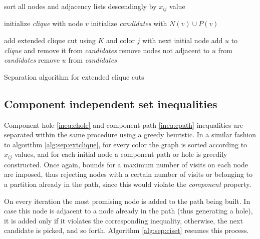 \begin{algorithm}
\begin{algorithmic}

\STATE sort all nodes and adjacency lists descendingly by $x_{ij}$ value
 
	\STATE initialize \textit{clique} with node $v$
	\STATE initialize \textit{candidates} with $N(v) \cup P(v)$

				\STATE add extended clique cut using $K$ and color $j$ 
			\ENDFOR
			\CONTINUE with next initial node
			\STATE add $u$ to \textit{clique} and remove it from \textit{candidates} 
			\STATE remove nodes not adjacent to $u$ from \textit{candidates} 
		\ELSE
			\STATE remove $u$ from \textit{candidates}
		\ENDIF
	\ENDWHILE
		
\ENDFOR
\ENDFOR

\caption{Separation algorithm for extended clique cuts}
\label{alg:sep:extclique}

\end{algorithmic}
\end{algorithm} 

\subsection{Component independent set inequalities}

Component hole \ref{ineq:chole} and component path \ref{ineq:cpath} inequalities are separated within the same procedure using a greedy heuristic. In a similar fashion to algorithm \ref{alg:sep:extclique}, for every color the graph is sorted according to $x_{ij}$ values, and for each initial node a component path or hole is greedily constructed. Once again, bounds for a maximum number of visits on each node are imposed, thus rejecting nodes with a certain number of visits or belonging to a partition already in the path, since this would violate the \textit{component} property.

On every iteration the most promising node is added to the path being built. In case this node is adjacent to a node already in the path (thus generating a hole), it is added only if it violates the corresponding inequality, otherwise, the next candidate is picked, and so forth. Algorithm \ref{alg:sep:ciset} resumes this process.

